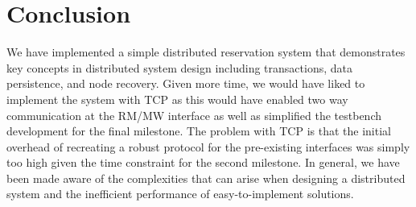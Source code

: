 \documentclass{article}
\begin{document}
\section{Conclusion}

We have implemented a simple distributed reservation system that demonstrates key concepts in distributed system design including transactions, data persistence, and node recovery. Given more time, we would have liked to implement the system with TCP as this would have enabled two way communication at the RM/MW interface as well as simplified the testbench development for the final milestone. The problem with TCP is that the initial overhead of recreating a robust protocol for the pre-existing interfaces was simply too high given the time constraint for the second milestone. In general, we have been made aware of the complexities that can arise when designing a distributed system and the inefficient performance of easy-to-implement solutions.
\end{document}
